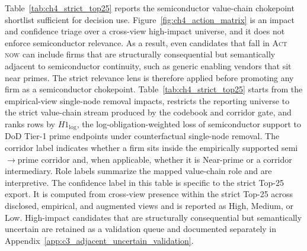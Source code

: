 \begin{table}[tbp]
  \centering
  \caption[\textit{Top-25 value-chain chokepoints}]{\textit{Top-25 value-chain chokepoints}}
  \label{tab:ch4_strict_top25}

  \footnotesize
  \setlength{\tabcolsep}{6pt}
  \renewcommand{\arraystretch}{1.04}

  

  \captionsetup{justification=raggedright,singlelinecheck=false}
  \caption*{\footnotesize \textit{Note}. This table reports the 25 most structurally consequential nodes under the empirical view (including disclosed SCR ties and observed shipping) after applying the semiconductor value-chain strict relevance lens. Rows are ranked by $H1_{\log}$, the section's primary \textit{deny} severity metric. ``Corridor'' indicates nodes embedded in the empirically supported semi$\rightarrow$prime corridor. ``Near'' indicates nodes one step upstream of primes within that corridor definition. Role labels are interpretive and do not affect ranking.}
\end{table}

Table~\ref{tab:ch4_strict_top25} reports the semiconductor value-chain chokepoint shortlist sufficient for decision use. Figure~\ref{fig:ch4_action_matrix} is an impact and confidence triage over a cross-view high-impact universe, and it does not enforce semiconductor relevance. As a result, even candidates that fall in \textsc{Act now} can include firms that are structurally consequential but semantically adjacent to semiconductor continuity, such as generic enabling vendors that sit near primes. The strict relevance lens is therefore applied before promoting any firm as a semiconductor chokepoint. Table~\ref{tab:ch4_strict_top25} starts from the empirical-view single-node removal impacts, restricts the reporting universe to the strict value-chain stream produced by the codebook and corridor gate, and ranks rows by $H1_{\log}$, the log-obligation-weighted loss of semiconductor support to DoD Tier-1 prime endpoints under counterfactual single-node removal. The corridor label indicates whether a firm sits inside the empirically supported semi$\rightarrow$prime corridor and, when applicable, whether it is Near-prime or a corridor intermediary. Role labels summarize the mapped value-chain role and are interpretive. The confidence label in this table is specific to the strict Top-25 export. It is computed from cross-view presence within the strict Top-25 across disclosed, empirical, and augmented views and is reported as High, Medium, or Low. High-impact candidates that are structurally consequential but semantically uncertain are retained as a validation queue and documented separately in Appendix~\ref{app:c3_adjacent_uncertain_validation}.

